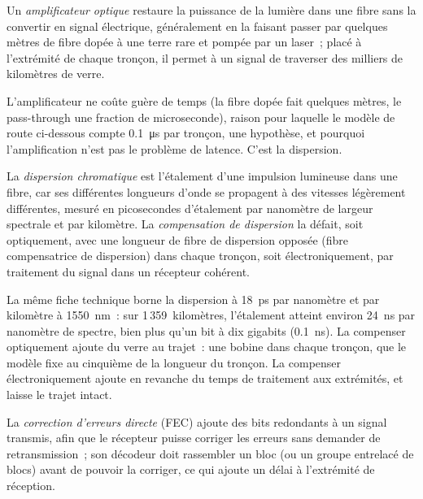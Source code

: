 \begin{definition}\label{def:nw:long-haul-fibre:amp}
Un \emph{amplificateur optique} restaure la puissance de la lumière dans une fibre sans la convertir en signal électrique,
généralement en la faisant passer par quelques mètres de fibre dopée à une terre rare et pompée par un laser~; placé à l'extrémité de chaque tronçon,
il permet à un signal de traverser des milliers de kilomètres de verre.
\end{definition}

L'amplificateur ne coûte guère de temps (la fibre dopée fait quelques mètres, le pass-through une fraction de microseconde), raison pour laquelle le modèle de route ci-dessous
compte \qty{0.1}{\micro\second} par tronçon, une hypothèse, et pourquoi l'amplification n'est pas le problème de latence. C'est la dispersion.

\begin{definition}\label{def:nw:long-haul-fibre:disp}
La \emph{dispersion chromatique} est l'étalement d'une impulsion lumineuse dans une fibre, car ses différentes longueurs d'onde se propagent
à des vitesses légèrement différentes, mesuré en picosecondes d'étalement par nanomètre de largeur spectrale et par kilomètre. La \emph{compensation
de dispersion} la défait, soit optiquement, avec une longueur de fibre de dispersion opposée (fibre compensatrice
de dispersion) dans chaque tronçon, soit électroniquement, par traitement du signal dans un récepteur cohérent.
\end{definition}

La même fiche technique borne la dispersion à \qty{18}{\pico\second} par nanomètre et par kilomètre à \qty{1550}{\nano\metre}~: sur 1\,359~kilomètres, l'étalement atteint environ
\qty{24}{\nano\second} par nanomètre de spectre, bien plus qu'un bit à dix gigabits (\qty{0.1}{\nano\second}). La compenser
optiquement ajoute du verre au trajet~: une bobine dans chaque tronçon, que le modèle fixe au cinquième de la longueur du tronçon. La compenser électroniquement
ajoute en revanche du temps de traitement aux extrémités, et laisse le trajet intact.

\begin{definition}\label{def:nw:long-haul-fibre:fec}
La \emph{correction d'erreurs directe} (FEC) ajoute des bits redondants à un signal transmis, afin que le récepteur puisse
corriger les erreurs sans demander de retransmission~; son décodeur doit rassembler un bloc (ou un groupe entrelacé de blocs) avant de pouvoir
la corriger, ce qui ajoute un délai à l'extrémité de réception.
\end{definition}


